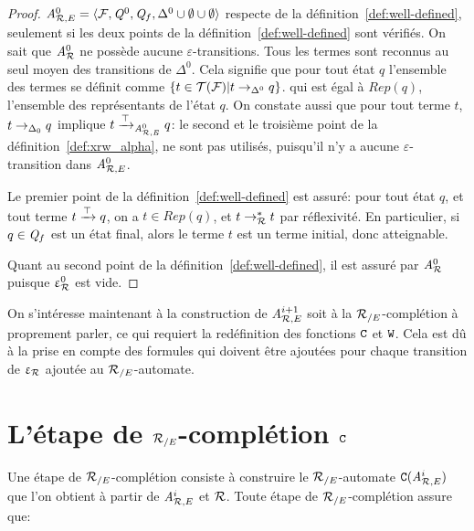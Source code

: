 \begin{proof}
  ${\mathit A}_{\mathcal R,E}^0 = \langle \mathcal{F}, \mathit Q^0, \mathit Q_f, \Delta^0 \cup \emptyset \cup \emptyset\rangle$
  respecte de la définition~\ref{def:well-defined}, seulement si les deux points
  de la définition~\ref{def:well-defined} sont vérifiés.
  \noindent
  On sait que ${\mathit A}_{\mathcal R}^0$ ne possède aucune $\varepsilon$-transitions.
  Tous les termes sont reconnus au seul moyen des transitions de $\Delta^0$.
  Cela signifie que pour tout état $q$ l'ensemble des termes se définit comme $\{ t \in \mathcal{T(F)} | t \rightarrow_{\Delta^0} q\}$.
  qui est égal à $Rep(q)$, l'ensemble des représentants de l'état $q$.
  On constate aussi que pour tout terme $t$, $t \rightarrow_{\Delta_0} q$ implique $t \xrightarrow{\top}_{{\mathit A}_{\mathcal R,E}^0} q$:
  le second et le troisième point de la définition~\ref{def:xrw_alpha}, ne sont pas utilisés, puisqu'il
  n'y a aucune $\varepsilon$-transition dans ${\mathit A}_{\mathcal R,E}^0$.
  
  Le premier point de la définition~\ref{def:well-defined} est assuré: 
  pour tout état $q$, et tout terme $t \xrightarrow{\top} q$, on a $t \in Rep(q)$, 
  et $t \rightarrow_\mathcal R^* t$ par réflexivité. En particulier, si $q \in \mathit Q_f$ est un 
  état final, alors le terme $t$ est un terme initial, donc atteignable.

  Quant au second point de la définition~\ref{def:well-defined}, il est assuré par ${\mathit A}_{\mathcal R}^0$ puisque $\upvarepsilon_{\mathcal R}^0$ est vide.
\end{proof}

On s'intéresse maintenant à la construction de ${\mathit A}_{\mathcal R,E}^{i+1}$ soit à la ${\mathcal R_{/E}}$-complétion à proprement parler, ce
qui requiert la redéfinition des fonctions $\mathtt{C}$ et $\mathtt{W}$. Cela est dû à la prise en compte des formules
qui doivent être ajoutées pour chaque transition de $\upvarepsilon_{\mathcal R}$ ajoutée au ${\mathcal R_{/E}}$-automate.


\section{L'étape de ${\mathcal R_{/E}}$-complétion $\mathtt{C}$}

Une étape de ${\mathcal R_{/E}}$-complétion consiste à construire le ${\mathcal R_{/E}}$-automate $\mathtt{C}({\mathit A}_{\mathcal R,E}^i)$ que l'on obtient à partir de ${\mathit A}_{\mathcal R,E}^i$ et $\mathcal R$.
Toute étape de ${\mathcal R_{/E}}$-complétion assure que:


